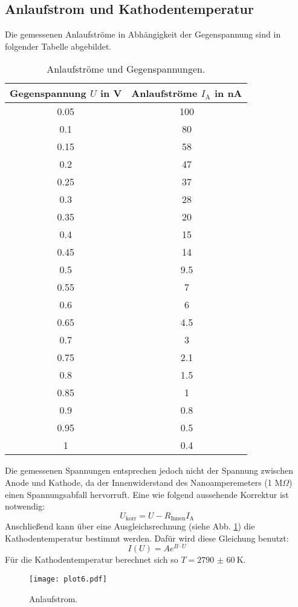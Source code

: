 \FloatBarrier
\subsection{Anlaufstrom und Kathodentemperatur}
\label{sec:anlauf}

Die gemessenen Anlaufströme in Abhängigkeit der Gegenspannung sind in folgender Tabelle abgebildet.
\begin{table}
\centering
\caption{Anlaufströme und Gegenspannungen.}
\label{tab:c}
\begin{tabular}{c c}
\toprule
Gegenspannung $U$ in V & Anlaufströme $I_\text{A}$ in nA \\
\midrule
0.05 & 100 \\
0.1  & 80  \\
0.15 & 58  \\
0.2  & 47  \\
0.25 & 37  \\
0.3  & 28  \\
0.35 & 20  \\
0.4  & 15  \\
0.45 & 14  \\
0.5  & 9.5 \\
0.55 & 7   \\
0.6  & 6   \\
0.65 & 4.5 \\
0.7  & 3   \\
0.75 & 2.1 \\
0.8  & 1.5 \\
0.85 & 1   \\
0.9  & 0.8 \\
0.95 & 0.5 \\
1    & 0.4 \\
\bottomrule
\end{tabular}
\end{table}
Die gemessenen Spannungen entsprechen jedoch nicht der Spannung zwischen Anode und Kathode, da der Innenwiderstand des Nanoamperemeters (1 M$\Omega$) einen Spannungsabfall hervorruft.
Eine wie folgend aussehende Korrektur ist notwendig:
\begin{equation*}
  U_\text{korr} = U - R_\text{Innen} I_\text{A}
\end{equation*}
Anschließend kann über eine Ausgleichsrechnung (siehe Abb. \ref{fig:plot6}) die Kathodentemperatur bestimmt werden.
Dafür wird diese Gleichung benutzt:
\begin{equation}
  I(U) = A e^{B \cdot U}
\end{equation}
Für die Kathodentemperatur berechnet sich so $T = \SI{2790(60)}{\kelvin}$.
\begin{figure}
  \centering
  \texttt{[image: plot6.pdf]}
  \caption{Anlaufstrom.}
  \label{fig:plot6}
\end{figure}

